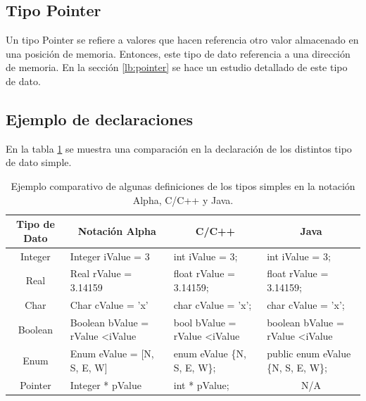 \subsection{Tipo Pointer}

Un tipo Pointer se refiere a valores que hacen referencia otro valor almacenado en una posición de memoria. Entonces, este tipo de dato referencia a una dirección de memoria. En la sección \ref{lb:pointer} se hace un estudio detallado de este tipo de dato.

\subsection{Ejemplo de declaraciones}

En la tabla \ref{tab:palabra} se muestra una comparación en la declaración de los distintos tipo de dato simple.

\begin{center}
\begin{table}[h]
\centering
\begin{tabular}{clll}
\hline
Tipo de Dato & \multicolumn{1}{c}{Notación Alpha}       & \multicolumn{1}{c}{C/C++}             & \multicolumn{1}{c}{Java}                 \\ \hline
Integer      & Integer iValue = 3                       & int iValue = 3;                       & int iValue = 3;                          \\
Real         & Real rValue = 3.14159                    & float rValue = 3.14159;               & float rValue = 3.14159;                  \\
Char         & Char cValue = 'x'                        & char cValue = 'x';                    & char cValue = 'x';                       \\
Boolean      & Boolean bValue = rValue \textless iValue & bool bValue = rValue \textless iValue & boolean bValue = rValue \textless iValue \\
Enum         & Enum eValue = {[}N, S, E, W{]}           & enum eValue \{N, S, E, W\};           & public enum eValue \{N, S, E, W\};       \\
Pointer      & Integer * pValue                         & int * pValue;                         & \multicolumn{1}{c}{N/A}                  \\ \hline
\end{tabular}
\caption{Ejemplo comparativo de algunas definiciones de los tipos simples en la notación Alpha, C/C++ y Java.}
\label{tab:palabra}
\end{table}
\end{center}

